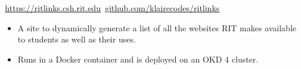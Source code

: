 \documentclass[11pt,letterpaper,ragged2e]{altacv}
\begin{document}
{
  \faLink\,\href{https://ritlinks.csh.rit.edu}{https://ritlinks.csh.rit.edu}
  \faGithub\,\href{https://github.com/klairecodes/ritlinks}{github.com/klairecodes/ritlinks}
}
{
  \begin{itemize}
      \item A site to dynamically generate a list of all the websites RIT makes available to students as well as their uses.
      \item Runs in a Docker container and is deployed on an OKD 4 cluster.
  \end{itemize}
}
{
}
{}


{} \

\clearpage

\nocite{*}
\end{document}
